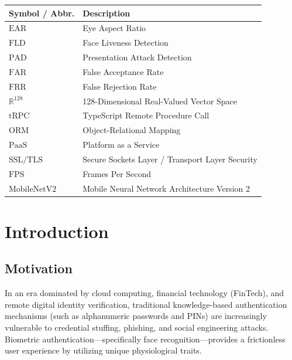 \documentclass[12pt,a4paper,oneside]{article}
\begin{document}
\begin{table}[h!]
\centering
\renewcommand{\arraystretch}{1.3}
\begin{tabular}{|p{3.5cm}|p{11cm}|}
\hline
\rowcolor{gray!15} \textbf{Symbol / Abbr.} & \textbf{Description} \\ \hline
$\text{EAR}$ & Eye Aspect Ratio \\ \hline
$\text{FLD}$ & Face Liveness Detection \\ \hline
$\text{PAD}$ & Presentation Attack Detection \\ \hline
$\text{FAR}$ & False Acceptance Rate \\ \hline
$\text{FRR}$ & False Rejection Rate \\ \hline
$\mathbb{R}^{128}$ & 128-Dimensional Real-Valued Vector Space \\ \hline
$\text{tRPC}$ & TypeScript Remote Procedure Call \\ \hline
$\text{ORM}$ & Object-Relational Mapping \\ \hline
$\text{PaaS}$ & Platform as a Service \\ \hline
$\text{SSL/TLS}$ & Secure Sockets Layer / Transport Layer Security \\ \hline
$\text{FPS}$ & Frames Per Second \\ \hline
$\text{MobileNetV2}$ & Mobile Neural Network Architecture Version 2 \\ \hline
\end{tabular}
\end{table}

\newpage
{}
\setcounter{page}{1}

\section{Introduction}
\label{sec:introduction}

\subsection{Motivation}
In an era dominated by cloud computing, financial technology (FinTech), and remote digital identity verification, traditional knowledge-based authentication mechanisms (such as alphanumeric passwords and PINs) are increasingly vulnerable to credential stuffing, phishing, and social engineering attacks. Biometric authentication—specifically face recognition—provides a frictionless user experience by utilizing unique physiological traits.
\end{document}
